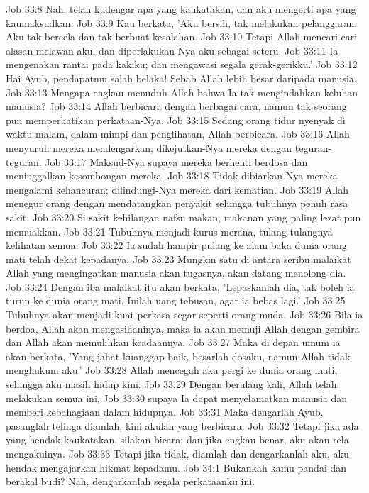 Job 33:8  Nah, telah kudengar apa yang kaukatakan, dan aku mengerti apa yang kaumaksudkan.
Job 33:9  Kau berkata, 'Aku bersih, tak melakukan pelanggaran. Aku tak bercela dan tak berbuat kesalahan.
Job 33:10  Tetapi Allah mencari-cari alasan melawan aku, dan diperlakukan-Nya aku sebagai seteru.
Job 33:11  Ia mengenakan rantai pada kakiku; dan mengawasi segala gerak-gerikku.'
Job 33:12  Hai Ayub, pendapatmu salah belaka! Sebab Allah lebih besar daripada manusia.
Job 33:13  Mengapa engkau menuduh Allah bahwa Ia tak mengindahkan keluhan manusia?
Job 33:14  Allah berbicara dengan berbagai cara, namun tak seorang pun memperhatikan perkataan-Nya.
Job 33:15  Sedang orang tidur nyenyak di waktu malam, dalam mimpi dan penglihatan, Allah berbicara.
Job 33:16  Allah menyuruh mereka mendengarkan; dikejutkan-Nya mereka dengan teguran-teguran.
Job 33:17  Maksud-Nya supaya mereka berhenti berdosa dan meninggalkan kesombongan mereka.
Job 33:18  Tidak dibiarkan-Nya mereka mengalami kehancuran; dilindungi-Nya mereka dari kematian.
Job 33:19  Allah menegur orang dengan mendatangkan penyakit sehingga tubuhnya penuh rasa sakit.
Job 33:20  Si sakit kehilangan nafsu makan, makanan yang paling lezat pun memuakkan.
Job 33:21  Tubuhnya menjadi kurus merana, tulang-tulangnya kelihatan semua.
Job 33:22  Ia sudah hampir pulang ke alam baka dunia orang mati telah dekat kepadanya.
Job 33:23  Mungkin satu di antara seribu malaikat Allah yang mengingatkan manusia akan tugasnya, akan datang menolong dia.
Job 33:24  Dengan iba malaikat itu akan berkata, 'Lepaskanlah dia, tak boleh ia turun ke dunia orang mati. Inilah uang tebusan, agar ia bebas lagi.'
Job 33:25  Tubuhnya akan menjadi kuat perkasa segar seperti orang muda.
Job 33:26  Bila ia berdoa, Allah akan mengasihaninya, maka ia akan memuji Allah dengan gembira dan Allah akan memulihkan keadaannya.
Job 33:27  Maka di depan umum ia akan berkata, 'Yang jahat kuanggap baik, besarlah dosaku, namun Allah tidak menghukum aku.'
Job 33:28  Allah mencegah aku pergi ke dunia orang mati, sehingga aku masih hidup kini.
Job 33:29  Dengan berulang kali, Allah telah melakukan semua ini,
Job 33:30  supaya Ia dapat menyelamatkan manusia dan memberi kebahagiaan dalam hidupnya.
Job 33:31  Maka dengarlah Ayub, pasanglah telinga diamlah, kini akulah yang berbicara.
Job 33:32  Tetapi jika ada yang hendak kaukatakan, silakan bicara; dan jika engkau benar, aku akan rela mengakuinya.
Job 33:33  Tetapi jika tidak, diamlah dan dengarkanlah aku, aku hendak mengajarkan hikmat kepadamu.
Job 34:1  Bukankah kamu pandai dan berakal budi? Nah, dengarkanlah segala perkataanku ini.
